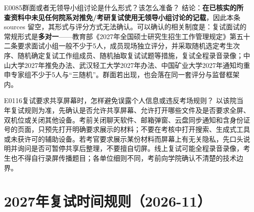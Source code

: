 \begin{qa}{E0085}{群面或者无领导小组讨论是什么形式？该怎么准备？}
结论：\textbf{在已核实的所查资料中未见任何院系对推免/考研复试使用无领导小组讨论的记载}，因此本条 sources 留空，其形式与评分方式无法确认。可以确认的相关制度是：复试面试的常规形式是\textbf{多对一}——教育部《2027年全国硕士研究生招生工作管理规定》第五十二条要求面试小组一般不少于5人，成员现场独立评分，并采取随机选定考生次序、随机确定复试工作组成员、随机抽取复试试题等措施，复试全程录音录像；中山大学2027年推免办法、武汉轻工大学2027年办法、中国矿业大学2027年通知均重申专家组不少于5人与“三随机”。群面若出现，也会落在同一套评分与监督框架内。
\end{qa}


\begin{qa}{E0116}{复试要求共享屏幕时，怎样避免误露个人信息或违反考场规则？}
以该院当年复试规则为准，先确认是否允许共享屏幕、允许打开哪些文件及是否要求全屏、双机位或关闭其他设备。考前关闭聊天软件、邮箱弹窗、云盘同步通知和含身份证号的页面，只预先打开明确要求展示的材料；不要在考核中打开搜索、生成式工具或未获许可的辅助设备。若考官要求展示某份材料而屏幕上有无关隐私，先口头说明并询问是否可暂停共享后整理，不要擅自切屏。线上复试可能全程录音录像，考生也不得自行录屏传播题目；各单位细则不同，考前向学院确认不清楚的技术边界。
\end{qa}
\section{2027年复试时间规则（2026-11）}

